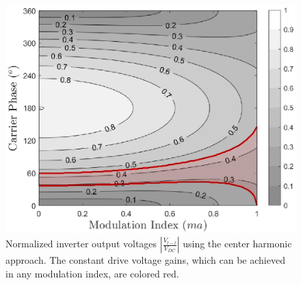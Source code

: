 \documentclass[journal]{IEEEtran}
\begin{document}
\begin{figure}[h!]
\centering
    \includegraphics[width=0.8\linewidth]{control_space_fall_restricted.eps}        
    \caption{ Normalized inverter output voltages $|\frac{V_{l-l}}{V_{DC}}|$ using the center harmonic approach. The constant drive voltage gains, which can be achieved in any modulation index, are colored red.}
    \label{fig:control_space_center}
\end{figure}
\end{document}
